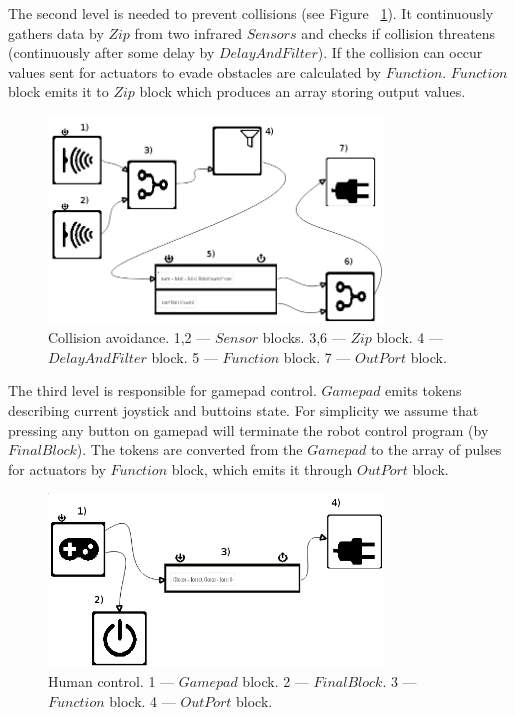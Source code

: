 \documentclass[conference,compsoc]{IEEEtran}
\begin{document}
The second level is needed to prevent collisions (see Figure ~\ref{image:2l}). It continuously gathers data by $Zip$ from two infrared $Sensors$ and checks if collision threatens (continuously after some delay by $DelayAndFilter$). If the collision can occur values sent for actuators to evade obstacles are calculated by $Function$. $Function$ block emits it to $Zip$ block which produces an array storing output values.

\begin{figure}[ht]
	\centering
	\includegraphics[width=3.5in]{2l.png}
	\caption{Collision avoidance. 1,2 --- $Sensor$ blocks. 3,6 --- $Zip$ block. 4 --- $DelayAndFilter$ block. 5 --- $Function$ block. 7 --- $OutPort$ block.}
	\label{image:2l}
\end{figure}

The third level is responsible for gamepad control. $Gamepad$ emits tokens describing current joystick and buttoins state. For simplicity we assume that pressing any button on gamepad will terminate the robot control program (by $FinalBlock$). The tokens are converted from the $Gamepad$ to the array of pulses for actuators by $Function$ block, which emits it through $OutPort$ block.

\begin{figure}[ht]
	\centering
	\includegraphics[width=3.5in]{3l.png}
	\caption{Human control. 1 --- $Gamepad$ block. 2 --- $FinalBlock$. 3 --- $Function$ block. 4 --- $OutPort$ block.}
	\label{image:3l}
\end{figure}
\end{document}
